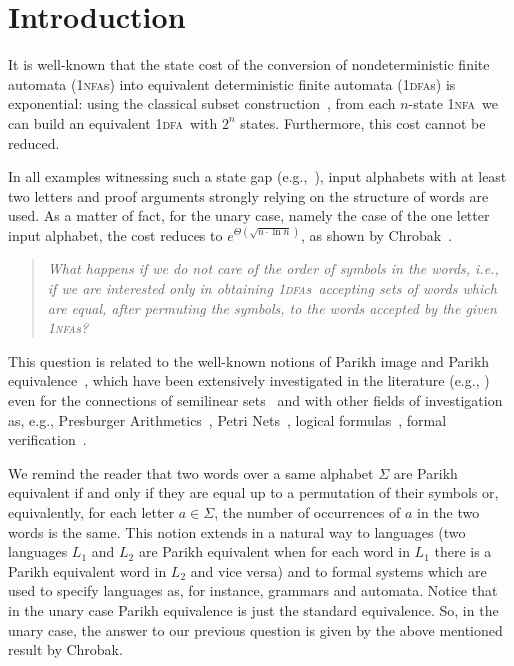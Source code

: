 \documentclass[11pt]{article}
\newcommand*{\ow}{\textsc{1}}
\newcommand*{\owdfa}{\ow\textsc{dfa}}
\newcommand*{\owdfas}{\ow\textsc{dfa}s}
\newcommand*{\ownfa}{\ow\textsc{nfa}}
\newcommand*{\ownfas}{\ow\textsc{nfa}s}
\begin{document}
\section{Introduction}


It is well-known that the state cost of the conversion of nondeterministic finite automata (\ownfas) into
equivalent deterministic finite automata (\owdfas) is exponential:
using the classical subset construction~\cite{RabinScott1959}, {}from each $n$-state \ownfa\ we can build 
an equivalent \owdfa\ with $2^n$ states.
Furthermore, this cost cannot be reduced.

In all examples witnessing such a state gap (e.g.,~\cite{Lupanov1963,MeyerFischer1971,Moore1971}),  
input alphabets with at least two letters
and proof arguments strongly relying on the structure of words are used.
As a matter of fact, for the unary case, namely the case of the one letter input alphabet, the cost
reduces to $e^{\Theta(\sqrt{n \cdot \ln n})}$, as shown by Chrobak~\cite{Chrobak1986}.

\begin{quote}
\emph{What happens if we do not care of the order of symbols in the words, i.e., if we are interested
only in obtaining \owdfas\ accepting sets of words which are equal, after permuting
the symbols, to the words accepted by the given \ownfas?}
\end{quote}

This question is related to the well-known notions of Parikh image and Parikh equivalence~\cite{Parikh1966},
which have been extensively investigated in the literature
(e.g., \cite{Goldstine77,AcetoEzikIngo02}) even for the connections of semilinear
sets~\cite{Huynh80} and with other fields of investigation as, e.g., 
Presburger Arithmetics~\cite{GinsburgSpanier66}, Petri Nets~\cite{Esparza97}, logical formulas~\cite{VermaSeidlSchwentick05},
formal verification~\cite{To10b}.


We remind the reader that two words over a same alphabet $\Sigma$ are Parikh equivalent if and only if they are equal up to a
permutation of their symbols or, equivalently, for each letter $a\in\Sigma$, the number of occurrences
of $a$ in the two words is the same.
This notion extends in a natural way to languages (two languages $L_1$ and $L_2$ are Parikh equivalent when
for each word in $L_1$ there is a Parikh equivalent word in $L_2$ and vice versa) and to formal
systems which are used to specify languages as, for instance, grammars and automata.
Notice that in the unary case Parikh equivalence is just the standard equivalence. So, in the unary case,
the answer to our previous question  is given by the above mentioned result by Chrobak.
\end{document}
